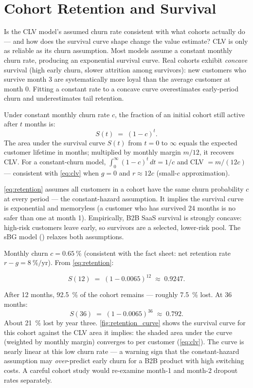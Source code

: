 \section{Cohort Retention and Survival}\label{sec:retention}

Is the CLV model's assumed churn rate consistent with what cohorts actually do --- and how does the survival curve shape change the value estimate? CLV is only as reliable as its churn assumption. Most models assume a constant monthly churn rate, producing an exponential survival curve. Real cohorts exhibit \emph{concave} survival (high early churn, slower attrition among survivors): new customers who survive month 3 are systematically more loyal than the average customer at month 0. Fitting a constant rate to a concave curve overestimates early-period churn and underestimates tail retention.

Under constant monthly churn rate \(c\), the fraction of an initial cohort still active after \(t\) months is:
\begin{equation}\label{eq:retention}
  S(t) \;=\; (1 - c)^{t} .
\end{equation}
The area under the survival curve \(S(t)\) from \(t=0\) to \(\infty\) equals the expected customer lifetime in months; multiplied by monthly margin \(m/12\), it recovers CLV. For a constant-churn model, \(\int_0^\infty (1-c)^t\,dt = 1/c\) and CLV \(= m/(12c)\) --- consistent with \cref{eq:clv} when \(g=0\) and \(r\approx 12c\) (small-\(c\) approximation).

\cref{eq:retention} assumes all customers in a cohort have the same churn probability \(c\) at every period --- the constant-hazard assumption. It implies the survival curve is exponential and memoryless (a customer who has survived 24 months is no safer than one at month 1). Empirically, B2B SaaS survival is strongly concave: high-risk customers leave early, so survivors are a selected, lower-risk pool. The sBG model (\textcite{fader2005rfm}) relaxes both assumptions.

\begin{example}
Monthly churn \(c = \qty{0.65}{\percent}\) (consistent with the fact sheet: net retention rate \(r - g = \qty{8}{\percent}/\text{yr}\)). From \cref{eq:retention}:

\[
  S(12) \;=\; (1 - 0.0065)^{12} \;\approx\; 0.9247.
\]

After 12 months, \qty{92.5}{\percent} of the cohort remains --- roughly \qty{7.5}{\percent} lost. At 36 months:
\[
  S(36) \;=\; (1 - 0.0065)^{36} \;\approx\; 0.792.
\]
About \qty{21}{\percent} lost by year three. \cref{fig:retention_curve} shows the survival curve for this cohort against the CLV area it implies: the shaded area under the curve (weighted by monthly margin) converges to  per customer (\cref{eq:clv}). The curve is nearly linear at this low churn rate --- a warning sign that the constant-hazard assumption may \emph{over}-predict early churn for a B2B product with high switching costs. A careful cohort study would re-examine month-1 and month-2 dropout rates separately.
\end{example}

